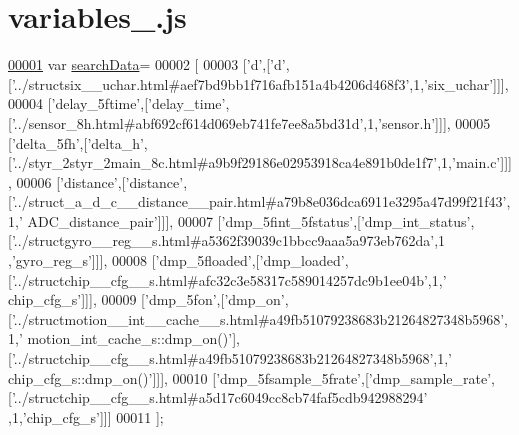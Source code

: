 \hypertarget{variables__4_8js_source}{}\section{variables\+\_.\+js}
\label{variables__4_8js_source}

\begin{DoxyCode}
\hypertarget{variables__4_8js_source.tex_l00001}{}\hyperlink{variables__4_8js_ad01a7523f103d6242ef9b0451861231e}{00001} var \hyperlink{variables__4_8js_ad01a7523f103d6242ef9b0451861231e}{searchData}=
00002 [
00003   [\textcolor{charliteral}{'d'},[\textcolor{charliteral}{'d'},[\textcolor{stringliteral}{'../structsix\_\_uchar.html#aef7bd9bb1f716afb151a4b4206d468f3'},1,\textcolor{stringliteral}{'six\_uchar'}]]],
00004   [\textcolor{stringliteral}{'delay\_5ftime'},[\textcolor{stringliteral}{'delay\_time'},[\textcolor{stringliteral}{'../sensor\_8h.html#abf692cf614d069eb741fe7ee8a5bd31d'},1,\textcolor{stringliteral}{'sensor.h'}]]],
00005   [\textcolor{stringliteral}{'delta\_5fh'},[\textcolor{stringliteral}{'delta\_h'},[\textcolor{stringliteral}{'../styr\_2styr\_2main\_8c.html#a9b9f29186e02953918ca4e891b0de1f7'},1,\textcolor{stringliteral}{'main.c'}]]],
00006   [\textcolor{stringliteral}{'distance'},[\textcolor{stringliteral}{'distance'},[\textcolor{stringliteral}{'../struct\_a\_d\_c\_\_distance\_\_pair.html#a79b8e036dca6911e3295a47d99f21f43'},1,\textcolor{stringliteral}{'
      ADC\_distance\_pair'}]]],
00007   [\textcolor{stringliteral}{'dmp\_5fint\_5fstatus'},[\textcolor{stringliteral}{'dmp\_int\_status'},[\textcolor{stringliteral}{'../structgyro\_\_reg\_\_s.html#a5362f39039c1bbcc9aaa5a973eb762da'},1
      ,\textcolor{stringliteral}{'gyro\_reg\_s'}]]],
00008   [\textcolor{stringliteral}{'dmp\_5floaded'},[\textcolor{stringliteral}{'dmp\_loaded'},[\textcolor{stringliteral}{'../structchip\_\_cfg\_\_s.html#afc32c3e58317c589014257dc9b1ee04b'},1,\textcolor{stringliteral}{'
      chip\_cfg\_s'}]]],
00009   [\textcolor{stringliteral}{'dmp\_5fon'},[\textcolor{stringliteral}{'dmp\_on'},[\textcolor{stringliteral}{'../structmotion\_\_int\_\_cache\_\_s.html#a49fb51079238683b21264827348b5968'},1,\textcolor{stringliteral}{'
      motion\_int\_cache\_s::dmp\_on()'}],[\textcolor{stringliteral}{'../structchip\_\_cfg\_\_s.html#a49fb51079238683b21264827348b5968'},1,\textcolor{stringliteral}{'
      chip\_cfg\_s::dmp\_on()'}]]],
00010   [\textcolor{stringliteral}{'dmp\_5fsample\_5frate'},[\textcolor{stringliteral}{'dmp\_sample\_rate'},[\textcolor{stringliteral}{'../structchip\_\_cfg\_\_s.html#a5d17c6049cc8cb74faf5cdb942988294'}
      ,1,\textcolor{stringliteral}{'chip\_cfg\_s'}]]]
00011 ];
\end{DoxyCode}
